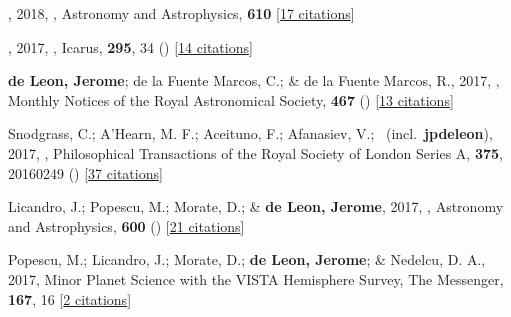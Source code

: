 \item[{\color{numcolor}\scriptsize79}] , 2018, , Astronomy and Astrophysics, \textbf{610} [\href{https://ui.adsabs.harvard.edu/abs/2018A&A...610A..25M}{17 citations}]

\item[{\color{numcolor}\scriptsize78}] , 2017, , Icarus, \textbf{295}, 34 () [\href{https://ui.adsabs.harvard.edu/abs/2017Icar..295...34F}{14 citations}]

\item[{\color{numcolor}\scriptsize77}] \textbf{de Leon, Jerome}; de la Fuente Marcos, C.; \& de la Fuente Marcos, R., 2017, , Monthly Notices of the Royal Astronomical Society, \textbf{467} () [\href{https://ui.adsabs.harvard.edu/abs/2017MNRAS.467L..66D}{13 citations}]

\item[{\color{numcolor}\scriptsize76}] Snodgrass, C.; A'Hearn, M. F.; Aceituno, F.; Afanasiev, V.; \etal\ (incl.\ \textbf{jpdeleon}), 2017, , Philosophical Transactions of the Royal Society of London Series A, \textbf{375}, 20160249 () [\href{https://ui.adsabs.harvard.edu/abs/2017RSPTA.37560249S}{37 citations}]

\item[{\color{numcolor}\scriptsize75}] Licandro, J.; Popescu, M.; Morate, D.; \& \textbf{de Leon, Jerome}, 2017, , Astronomy and Astrophysics, \textbf{600} () [\href{https://ui.adsabs.harvard.edu/abs/2017A&A...600A.126L}{21 citations}]

\item[{\color{numcolor}\scriptsize74}] Popescu, M.; Licandro, J.; Morate, D.; \textbf{de Leon, Jerome}; \& Nedelcu, D. A., 2017, Minor Planet Science with the VISTA Hemisphere Survey, The Messenger, \textbf{167}, 16 [\href{https://ui.adsabs.harvard.edu/abs/2017Msngr.167...16P}{2 citations}]

